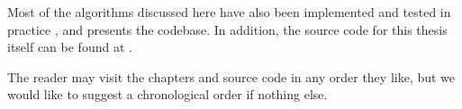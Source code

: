 Most of the algorithms discussed here have also been implemented and tested in practice \cite{source:codebase}, and  presents the codebase. In addition, the source code for this thesis itself can be found at \cite{source:thesis}.

The reader may visit the chapters and source code in any order they like, but we would like to suggest a chronological order if nothing else.
